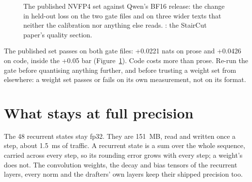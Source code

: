 \begin{figure}[htbp]
\centering
{}
\caption[The published weights against BF16]{The published NVFP4 set against Qwen's BF16 release: the change in held-out loss on the two gate files and on three wider texts that neither the calibration nor anything else reads. \measured: the StairCut paper's quality section.}\label{fig:quality}
\end{figure}

The published set passes on both gate files: +0.0221 nats on prose and +0.0426 on code, inside the +0.05 bar (Figure~\ref{fig:quality}). Code costs more than prose. Re-run the gate before quantising anything further, and before trusting a weight set from elsewhere: a weight set passes or fails on its own measurement, not on its format.

\section{What stays at full precision}

The 48 recurrent states stay fp32. They are 151~MB, read and written once a step, about 1.5~ms of traffic. A recurrent state is a sum over the whole sequence, carried across every step, so its rounding error grows with every step; a weight's does not. The convolution weights, the decay and bias tensors of the recurrent layers, every norm and the drafters' own layers keep their shipped precision too.

